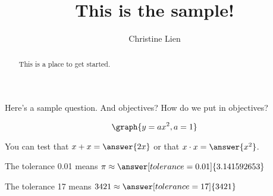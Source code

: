 \documentclass{ximera}
\title{This is the sample!}
\author{Christine Lien}
\begin{document}
\begin{abstract}
  This is a place to get started. 
\end{abstract}

\maketitle

Here's a sample question.
And objectives? How do we put in objectives?


\[\graph{y=ax^2, a=1}\]

\begin{problem}
\begin{multipleChoice}
\end{multipleChoice}
\end{problem}

\begin{problem}
   You can test that $x + x = \answer{2x}$ or that $x \cdot x = \answer{x^2}$.
\end{problem}

\begin{problem}
   The tolerance 0.01 means $\pi \approx \answer[tolerance=0.01]{3.141592653}$
\end{problem}

\begin{problem}
   The tolerance 17 means $3421 \approx \answer[tolerance=17]{3421}$
\end{problem}
\end{document}
